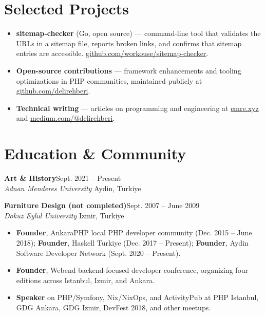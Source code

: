 \documentclass[11pt,a4paper]{article}
\newcommand{\role}[4]{%
  \par\addvspace{5pt}\noindent
  \textbf{#1}\hfill{\small #4}\\
  {\itshape #2}\hfill{\small\color{mutedtext} #3}\par\nopagebreak
}
\begin{document}
\section{Selected Projects}
\begin{itemize}
  \item \textbf{sitemap-checker} (Go, open source) --- command-line tool that validates the URLs in a sitemap file,
    reports broken links, and confirms that sitemap entries are accessible.
    \href{https://github.com/workouse/sitemap-checker}{github.com/workouse/sitemap-checker}.
  \item \textbf{Open-source contributions} --- framework enhancements and tooling optimizations in PHP communities,
    maintained publicly at \href{https://github.com/delirehberi}{github.com/delirehberi}.
  \item \textbf{Technical writing} --- articles on programming and engineering at
    \href{https://emre.xyz}{emre.xyz} and \href{https://medium.com/@delirehberi}{medium.com/@delirehberi}.
\end{itemize}

\section{Education \& Community}
\role{Art \& History}{Adnan Menderes University}{Aydin, Turkiye}{Sept. 2021 -- Present}
\role{Furniture Design (not completed)}{Dokuz Eylul University}{Izmir, Turkiye}{Sept. 2007 -- June 2009}
\begin{itemize}
  \item \textbf{Founder}, AnkaraPHP local PHP developer community (Dec. 2015 -- June 2018); \textbf{Founder},
    Haskell Turkiye (Dec. 2017 -- Present); \textbf{Founder}, Aydin Software Developer Network (Sept. 2020 -- Present).
  \item \textbf{Founder}, Webend backend-focused developer conference, organizing four editions across Istanbul,
    Izmir, and Ankara.
  \item \textbf{Speaker} on PHP/Symfony, Nix/NixOps, and ActivityPub at PHP Istanbul, GDG Ankara, GDG Izmir,
    DevFest 2018, and other meetups.
\end{itemize}
\end{document}
